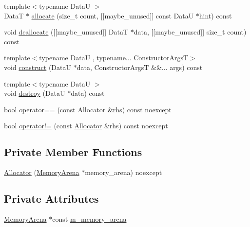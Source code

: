 \begin{DoxyCompactItemize}
\item 
{\footnotesize template$<$typename DataU $>$ }\\DataT $\ast$ \hyperlink{structmage_1_1_memory_arena_1_1_allocator_a8d32dee91beac60bc4799b4a0f96c63e}{allocate} (size\+\_\+t count, \mbox{[}\mbox{[}maybe\+\_\+unused\mbox{]}\mbox{]} const DataU $\ast$hint) const
\item 
void \hyperlink{structmage_1_1_memory_arena_1_1_allocator_a99e54c737121a9355aae099601dce411}{deallocate} (\mbox{[}\mbox{[}maybe\+\_\+unused\mbox{]}\mbox{]} DataT $\ast$data, \mbox{[}\mbox{[}maybe\+\_\+unused\mbox{]}\mbox{]} size\+\_\+t count) const
\item 
{\footnotesize template$<$typename DataU , typename... Constructor\+ArgsT$>$ }\\void \hyperlink{structmage_1_1_memory_arena_1_1_allocator_a129048e929be140b41279ea1593a2333}{construct} (DataU $\ast$data, Constructor\+ArgsT \&\&... args) const
\item 
{\footnotesize template$<$typename DataU $>$ }\\void \hyperlink{structmage_1_1_memory_arena_1_1_allocator_a17aa35d167f5c5d7fa8b65c889df9484}{destroy} (DataU $\ast$data) const
\item 
bool \hyperlink{structmage_1_1_memory_arena_1_1_allocator_a5f81981cef3395ffdf4217ba28d86c72}{operator==} (const \hyperlink{structmage_1_1_memory_arena_1_1_allocator}{Allocator} \&rhs) const noexcept
\item 
bool \hyperlink{structmage_1_1_memory_arena_1_1_allocator_ac1e8e59f0122286c96f73646c4d59f18}{operator!=} (const \hyperlink{structmage_1_1_memory_arena_1_1_allocator}{Allocator} \&rhs) const noexcept
\end{DoxyCompactItemize}
\subsection*{Private Member Functions}
\begin{DoxyCompactItemize}
\item 
\hyperlink{structmage_1_1_memory_arena_1_1_allocator_a10a6ea82aab121d4e04efa004a49910b}{Allocator} (\hyperlink{classmage_1_1_memory_arena}{Memory\+Arena} $\ast$memory\+\_\+arena) noexcept
\end{DoxyCompactItemize}
\subsection*{Private Attributes}
\begin{DoxyCompactItemize}
\item 
\hyperlink{classmage_1_1_memory_arena}{Memory\+Arena} $\ast$const \hyperlink{structmage_1_1_memory_arena_1_1_allocator_a821cb29f5f5c5d1581f87e9dac143d53}{m\+\_\+memory\+\_\+arena}
\end{DoxyCompactItemize}
